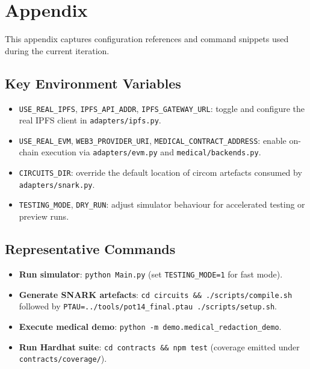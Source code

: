 \appendix

\section{Appendix}

This appendix captures configuration references and command snippets used during the current iteration.

\subsection{Key Environment Variables}
\begin{itemize}
    \item \texttt{USE\_REAL\_IPFS}, \texttt{IPFS\_API\_ADDR}, \texttt{IPFS\_GATEWAY\_URL}: toggle and configure the real IPFS client in \texttt{adapters/ipfs.py}.
    \item \texttt{USE\_REAL\_EVM}, \texttt{WEB3\_PROVIDER\_URI}, \texttt{MEDICAL\_CONTRACT\_ADDRESS}: enable on-chain execution via \texttt{adapters/evm.py} and \texttt{medical/backends.py}.
    \item \texttt{CIRCUITS\_DIR}: override the default location of circom artefacts consumed by \texttt{adapters/snark.py}.
    \item \texttt{TESTING\_MODE}, \texttt{DRY\_RUN}: adjust simulator behaviour for accelerated testing or preview runs.
\end{itemize}

\subsection{Representative Commands}
\begin{itemize}
    \item \textbf{Run simulator}: \texttt{python Main.py} (set \texttt{TESTING\_MODE=1} for fast mode).
    \item \textbf{Generate SNARK artefacts}: \texttt{cd circuits \&\& ./scripts/compile.sh} followed by \texttt{PTAU=../tools/pot14\_final.ptau ./scripts/setup.sh}.
    \item \textbf{Execute medical demo}: \texttt{python -m demo.medical\_redaction\_demo}.
    \item \textbf{Run Hardhat suite}: \texttt{cd contracts \&\& npm test} (coverage emitted under \texttt{contracts/coverage/}).
\end{itemize}
